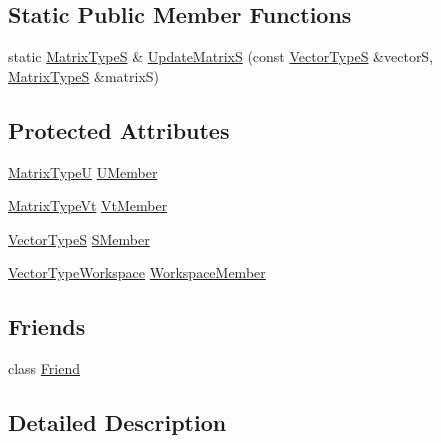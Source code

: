 \subsection*{Static Public Member Functions}
\begin{DoxyCompactItemize}
\item 
static \hyperlink{classnmr_s_v_d_fixed_size_data_a4abee9caa16efd9bed6df1b4deec9207}{Matrix\-Type\-S} \& \hyperlink{classnmr_s_v_d_fixed_size_data_a635c5cdaa9e48c8302ab0069a63db82b}{Update\-Matrix\-S} (const \hyperlink{classnmr_s_v_d_fixed_size_data_ad9ec4977d4726118af8c7bce3d18b752}{Vector\-Type\-S} \&vector\-S, \hyperlink{classnmr_s_v_d_fixed_size_data_a4abee9caa16efd9bed6df1b4deec9207}{Matrix\-Type\-S} \&matrix\-S)
\end{DoxyCompactItemize}
\subsection*{Protected Attributes}
\begin{DoxyCompactItemize}
\item 
\hyperlink{classnmr_s_v_d_fixed_size_data_a164bbc8eccf8b1102d5a85dde45de99d}{Matrix\-Type\-U} \hyperlink{classnmr_s_v_d_fixed_size_data_ad26dae6ca89cbab697b173587128bee8}{U\-Member}
\item 
\hyperlink{classnmr_s_v_d_fixed_size_data_ab9a7c396f7a83256d5e8c789b3a23591}{Matrix\-Type\-Vt} \hyperlink{classnmr_s_v_d_fixed_size_data_a1c07f9c42ce77a3a5c4d922b551b678e}{Vt\-Member}
\item 
\hyperlink{classnmr_s_v_d_fixed_size_data_ad9ec4977d4726118af8c7bce3d18b752}{Vector\-Type\-S} \hyperlink{classnmr_s_v_d_fixed_size_data_a4082c30345cdec4efd06e43a5343037e}{S\-Member}
\item 
\hyperlink{classnmr_s_v_d_fixed_size_data_a82162baa88dba7eb39bb52b71435aaa9}{Vector\-Type\-Workspace} \hyperlink{classnmr_s_v_d_fixed_size_data_a2821e6d6be56a77b1584b9994d7b1a83}{Workspace\-Member}
\end{DoxyCompactItemize}
\subsection*{Friends}
\begin{DoxyCompactItemize}
\item 
class \hyperlink{classnmr_s_v_d_fixed_size_data_a7f8321d57e81bc613d5dbef3410ba70e}{Friend}
\end{DoxyCompactItemize}


\subsection{Detailed Description}
